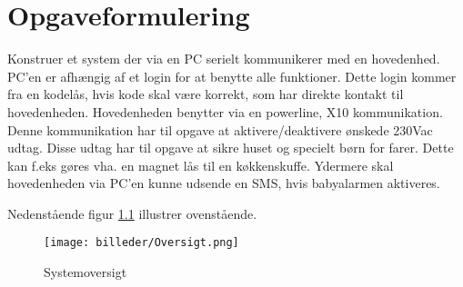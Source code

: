 \chapter{Opgaveformulering}


Konstruer et system der via en PC serielt kommunikerer med en hovedenhed. PC'en er afhængig af et login for at benytte alle funktioner. Dette login kommer fra en kodelås, hvis kode skal være korrekt, som har direkte kontakt til hovedenheden. Hovedenheden benytter via en powerline, X10 kommunikation. Denne kommunikation har til opgave at aktivere/deaktivere ønskede 230Vac udtag. Disse udtag har til opgave at sikre huset og specielt børn for farer. Dette kan f.eks gøres vha. en magnet lås til en køkkenskuffe.   
Ydermere skal hovedenheden via PC'en kunne udsende en SMS, hvis babyalarmen aktiveres.

Nedenstående figur \ref{fig:Systemoversigt} illustrer ovenstående.

\begin{figure}[htbp]
  \centering
    \texttt{[image: billeder/Oversigt.png]}
    \caption{Systemoversigt}
    \label{fig:Systemoversigt}
\end{figure}